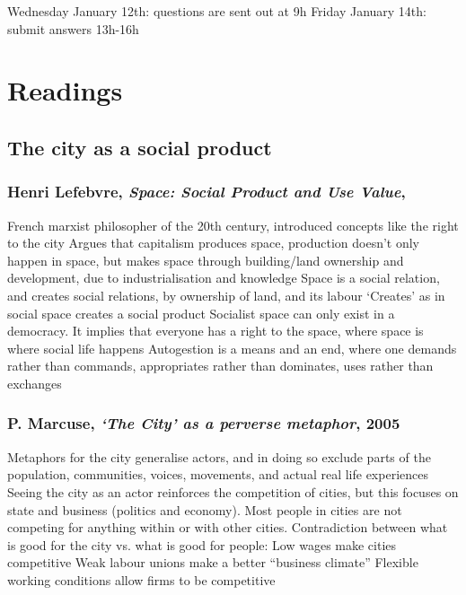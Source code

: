 \documentclass{article}
\begin{document}

Wednesday January 12th: questions are sent out at 9h
Friday January 14th: submit answers 13h-16h


\section{Readings}

\subsection{The city as a social product}

\subsubsection{Henri Lefebvre, \textit{Space: Social Product and Use Value}, }

\begin{outline}
	\1 French marxist philosopher of the 20th century, introduced concepts like the right to the city
	\1 Argues that capitalism produces space, production doesn't only happen in space, but makes space through building/land ownership and development, due to industrialisation and knowledge
	\1 Space is a social relation, and creates social relations, by ownership of land, and its labour
		\2 `Creates' as in social space creates a social product
	\1 Socialist space can only exist in a democracy. It implies that everyone has a right to the space, where space is where social life happens
	\1 Autogestion is a means and an end, where one demands rather than commands, appropriates rather than dominates, uses rather than exchanges
\end{outline}

\subsubsection{P. Marcuse, \textit{`The City' as a perverse metaphor}, 2005}

\begin{outline}
	\1 Metaphors for the city generalise actors, and in doing so exclude parts of the population, communities, voices, movements, and actual real life experiences
	\1 Seeing the city as an actor reinforces the competition of cities, but this focuses on state and business (politics and economy). Most people in cities are not competing for anything within or with other cities. 
	\1 Contradiction between what is good for the city vs. what is good for people:
		\2 Low wages make cities competitive
		\2 Weak labour unions make a better ``business climate''
		\2 Flexible working conditions allow firms to be competitive
\end{outline}
\end{document}
